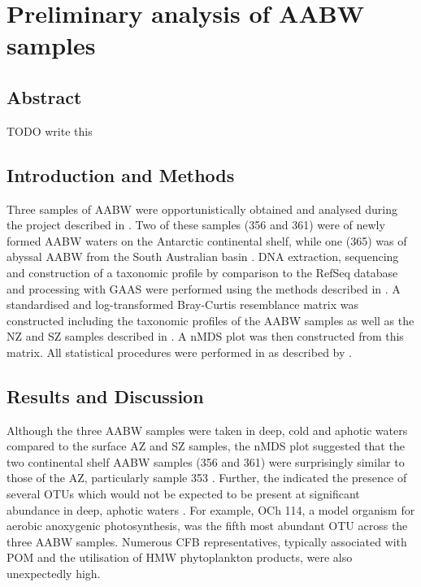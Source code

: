 \chapter{Preliminary analysis of \ac{AABW} samples}
\label{ch:deepwaterformation}

\section{Abstract}

TODO write this

\section{Introduction and Methods}


Three samples of \ac{AABW} were opportunistically obtained and analysed during the project described in  .
Two of these samples (356 and 361) were of newly formed \ac{AABW} waters on the Antarctic continental shelf, while one (365) was of abyssal \ac{AABW} from the South Australian basin .
DNA extraction, sequencing and construction of a taxonomic profile by  comparison to the RefSeq database and processing with \ac{GAAS} were performed using the methods described in .
A standardised and log-transformed Bray-Curtis resemblance matrix was constructed including the taxonomic profiles of the \ac{AABW} samples as well as the \ac{NZ} and \ac{SZ} samples described in .
A \ac{nMDS} plot was then constructed from this matrix.
All statistical procedures were performed in  as described by \citet{Clarke:2001ut}.

\section{Results and Discussion}

Although the three \ac{AABW} samples were taken in deep, cold and aphotic waters  compared to the surface \ac{AZ} and \ac{SZ} samples, the \ac{nMDS} plot suggested that the two continental shelf \ac{AABW} samples (356 and 361) were surprisingly similar to those of the \ac{AZ}, particularly sample 353 .
Further, the indicated the presence of several \acp{OTU} which would not be expected to be present at significant abundance in deep, aphotic waters .
For example,  OCh 114, a model organism for aerobic anoxygenic photosynthesis, was the fifth most abundant \ac{OTU} across the three \ac{AABW} samples.
Numerous \ac{CFB} representatives, typically associated with \ac{POM} and the utilisation of \ac{HMW} phytoplankton products, were also unexpectedly high.

